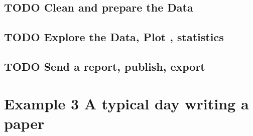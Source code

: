 \documentclass[11pt]{article}
\begin{document}
\subsection{{\bfseries\sffamily TODO} Clean and prepare the Data}
\label{sec:orgfe258e0}
\subsection{{\bfseries\sffamily TODO} Explore the Data, Plot , statistics}
\label{sec:org672771a}
\subsection{{\bfseries\sffamily TODO} Send a report, publish, export}
\label{sec:org1de3792}
\section{Example 3 A typical day writing a paper}
\label{sec:org8f0c8fc}
\end{document}

